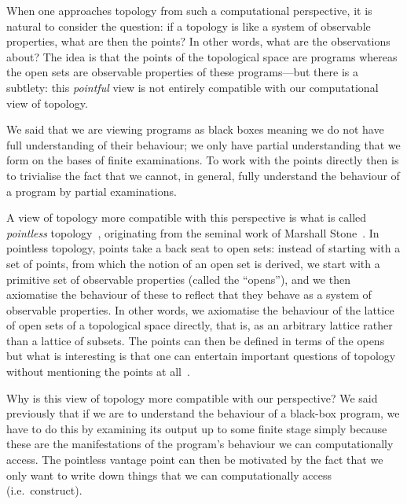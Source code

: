 When one approaches topology from such a computational perspective, it is natural to
consider the question: if a topology is like a system of observable properties, what are
then the points? In other words, what are the observations about? The idea is that the
points of the topological space are programs whereas the open sets are observable
properties of these programs---but there is a subtlety: this \emph{pointful} view is not
entirely compatible with our computational view of topology.

We said that we are viewing programs as black boxes meaning we do not have full
understanding of their behaviour; we only have partial understanding that we form on the
bases of finite examinations. To work with the points directly then is to trivialise the
fact that we cannot, in general, fully understand the behaviour of a program by partial
examinations.

A view of topology more compatible with this perspective is what is called
\emph{pointless} topology~\cite{johnstone-the-point}, originating from the seminal work of
Marshall Stone~\cite{stone-original}. In pointless topology, points take a back seat to
open sets: instead of starting with a set of points, from which the notion of an open set
is derived, we start with a primitive set of observable properties (called the ``opens''),
and we then axiomatise the behaviour of these to reflect that they behave as a system of
observable properties. In other words, we axiomatise the behaviour of the lattice of open
sets of a topological space directly, that is, as an arbitrary lattice rather than a
lattice of subsets. The points can then be defined in terms of the opens but what is
interesting is that one can entertain important questions of topology without mentioning
the points at all~\cite{johnstone-the-point}.

Why is this view of topology more compatible with our perspective? We said previously that
if we are to understand the behaviour of a black-box program, we have to do this by
examining its output up to some finite stage simply because these are the manifestations
of the program's behaviour we can computationally access. The pointless vantage point can
then be motivated by the fact that we only want to write down things that we can
computationally access (i.e.~construct).

